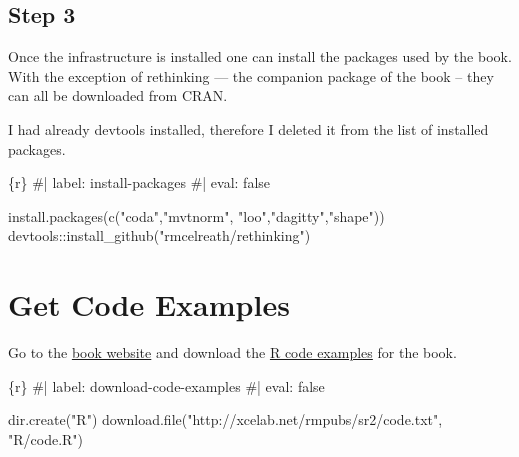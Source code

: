 \documentclass[
  letterpaper,
  DIV=11,
  numbers=noendperiod]{scrreprt}
\newenvironment{Shaded}{\begin{snugshade}}{\end{snugshade}}
\newcommand{\CommentTok}[1]{\textcolor[rgb]{0.37,0.37,0.37}{#1}}
\newcommand{\FunctionTok}[1]{\textcolor[rgb]{0.28,0.35,0.67}{#1}}
\newcommand{\InformationTok}[1]{\textcolor[rgb]{0.37,0.37,0.37}{#1}}
\newcommand{\NormalTok}[1]{\textcolor[rgb]{0.00,0.23,0.31}{#1}}
\newcommand{\SpecialCharTok}[1]{\textcolor[rgb]{0.37,0.37,0.37}{#1}}
\newcommand{\StringTok}[1]{\textcolor[rgb]{0.13,0.47,0.30}{#1}}
\begin{document}
\hypertarget{step-3}{%
\subsection*{Step 3}\label{step-3}}

Once the infrastructure is installed one can install the packages used
by the book. With the exception of rethinking --- the companion package
of the book -- they can all be downloaded from CRAN.

I had already devtools installed, therefore I deleted it from the list
of installed packages.

\begin{Shaded}
\begin{Highlighting}[]
\InformationTok{\textasciigrave{}\textasciigrave{}\textasciigrave{}\{r\}}
\CommentTok{\#| label: install{-}packages}
\CommentTok{\#| eval: false}

\FunctionTok{install.packages}\NormalTok{(}\FunctionTok{c}\NormalTok{(}\StringTok{"coda"}\NormalTok{,}\StringTok{"mvtnorm"}\NormalTok{, }\StringTok{"loo"}\NormalTok{,}\StringTok{"dagitty"}\NormalTok{,}\StringTok{"shape"}\NormalTok{))}
\NormalTok{devtools}\SpecialCharTok{::}\FunctionTok{install\_github}\NormalTok{(}\StringTok{"rmcelreath/rethinking"}\NormalTok{)}

\InformationTok{\textasciigrave{}\textasciigrave{}\textasciigrave{}}
\end{Highlighting}
\end{Shaded}

\hypertarget{get-code-examples}{%
\section*{Get Code Examples}\label{get-code-examples}}


Go to the \href{https://xcelab.net/rm/statistical-rethinking/}{book
website} and download the \href{http://xcelab.net/rmpubs/sr2/code.txt}{R
code examples} for the book.

\begin{Shaded}
\begin{Highlighting}[]
\InformationTok{\textasciigrave{}\textasciigrave{}\textasciigrave{}\{r\}}
\CommentTok{\#| label: download{-}code{-}examples}
\CommentTok{\#| eval: false}

\FunctionTok{dir.create}\NormalTok{(}\StringTok{"R"}\NormalTok{)}
\FunctionTok{download.file}\NormalTok{(}\StringTok{"http://xcelab.net/rmpubs/sr2/code.txt"}\NormalTok{, }\StringTok{"R/code.R"}\NormalTok{)}

\InformationTok{\textasciigrave{}\textasciigrave{}\textasciigrave{}}
\end{Highlighting}
\end{Shaded}
\end{document}
